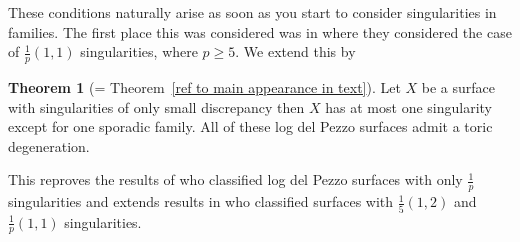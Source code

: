 \documentclass[12pt]{amsart}
\theoremstyle{definition}
\newtheorem{thm}{Theorem}[section]
\theoremstyle{definition}
\theoremstyle{definition}
\theoremstyle{definition}
\theoremstyle{definition}
\theoremstyle{definition}
\theoremstyle{definition}
\theoremstyle{definition}
\begin{document}
These conditions naturally arise as soon as you start to consider singularities in families. The first place this was considered was in \cite{CP} where they considered the case of $\frac{1}{p}(1,1)$ singularities, where $p \geq 5$. We extend this by


\begin{thm}[= Theorem~\ref{ref to main appearance in text}]
Let $X$ be a surface with singularities of only small discrepancy then $X$ has at most one singularity except for one sporadic family. All of these log del Pezzo surfaces admit a toric degeneration.
\end{thm}

This reproves the results of \cite{CP} who classified log del Pezzo surfaces with only $\frac{1}{p}$ singularities and extends results in \cite{Cuzzo} who classified surfaces with $\frac{1}{5}(1,2)$  and $\frac{1}{p}(1,1)$ singularities.
\end{document}
